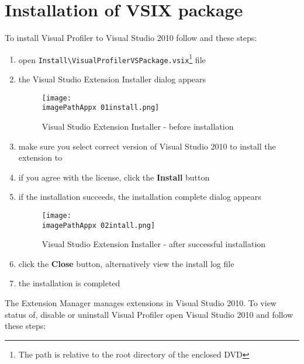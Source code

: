 \section{Installation of VSIX package}
To install Visual Profiler to Visual Studio 2010 follow and these steps: 
\begin{enumerate}
\item open \texttt{Install\textbackslash VisualProfilerVSPackage.vsix}\footnote{The path is relative to the root directory of the enclosed DVD} file 

\item the Visual Studio Extension Installer dialog appears

\begin{figure}[H]
	\centering
		\texttt{[image: \\imagePathAppx 01install.png]}
		\caption{Visual Studio Extension Installer - before installation}
	\label{fig:0901install}
\end{figure}

\item make sure you select correct version of Visual Studio 2010 to install the extension to 

\item if you agree with the license, click the \textbf{Install}
 button

\item if the installation succeeds, the installation complete dialog appears

\begin{figure}[H]
	\centering
		\texttt{[image: \\imagePathAppx 02intall.png]}
		\caption{Visual Studio Extension Installer - after successful installation}
	\label{fig:0902install}
\end{figure}

\item click the \textbf{Close} button, alternatively view the install log file

\item the installation is completed
\end{enumerate}



The Extension Manager manages extensions in Visual Studio 2010. To view status of, disable or uninstall Visual Profiler open Visual Studio 2010 and follow these steps:

